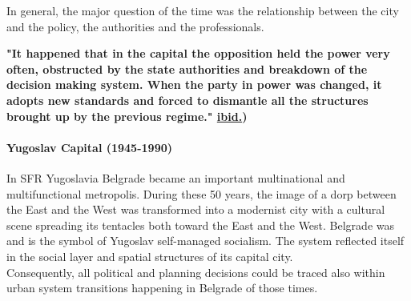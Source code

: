 \documentclass[11pt]{report}
\begin{document}
In general, the major question of the time was the relationship between the city and the policy, the authorities and the professionals.

\textbf{"It happened that in the capital the opposition held the power very often, obstructed by the state authorities and breakdown of the decision making system. When the party in power was changed, it adopts new standards and forced to dismantle all the structures brought up by the previous regime." \href{ref}{ibid.})}

\paragraph{Yugoslav Capital (1945-1990)}

In SFR Yugoslavia Belgrade became an important multinational and  multifunctional  metropolis. During these 50 years, the image of a dorp between the East and the West was transformed into a modernist city with a cultural scene spreading its tentacles both toward the East and the West. Belgrade was and is the symbol of Yugoslav self-managed socialism. The system reflected itself in the social layer and spatial structures of its capital city.
\\
Consequently, all political and planning decisions could be traced also within urban system transitions happening in Belgrade of those times.
\end{document}
